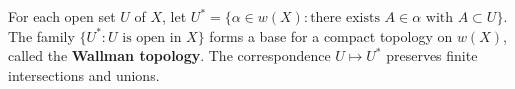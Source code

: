 For each open set $U$ of $X$, let $U^* = \{\alpha \in w(X) : \text{there exists } A \in \alpha \text{ with } A \subset U\}$. The family $\{U^* : U \text{ is open in } X\}$ forms a base for a compact topology on $w(X)$, called the \textbf{Wallman topology}. The correspondence $U \mapsto U^*$ preserves finite intersections and unions.
